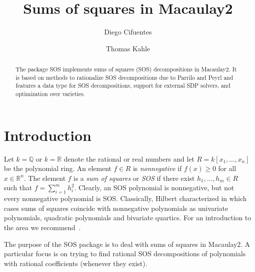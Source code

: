 \documentclass[11pt]{amsart}
\theoremstyle{plain}%
\theoremstyle{definition}
\theoremstyle{remark}
\newcommand{\SOS}{\textsc{SOS}\xspace}
\newcommand{\QQ}{\mathbb{Q}}
\newcommand{\RR}{\mathbb{R}}
\begin{document}
\title[SOS.m2]{Sums of squares in Macaulay2}

\author{Diego Cifuentes}
\address{Massachusetts Institute of Technology \\ Boston, USA}

\author{Thomas Kahle}
\address{Otto-von-Guericke University \\ Magdeburg, Germany}

\begin{abstract}
  The package \SOS implements sums of squares (SOS) decompositions in
  Macaulay2.  It is based on methods to rationalize SOS decompositions
  due to Parrilo and Peyrl and features a data type for SOS
  decompositions, support for external SDP solvers, and optimization
  over varieties.
\end{abstract}

\maketitle


\section{Introduction}

Let $k = \QQ$ or $k = \RR$ denote the rational or real numbers and let $R = k[x_{1},\dots,x_{n}]$ be the polynomial ring.  
An element $f\in R$ is \emph{nonnegative} if $f(x) \ge 0$ for all $x \in \RR^{n}$.  
The element $f$ is a \emph{sum of squares} or \emph{SOS} if there exist $h_{1},\dots,h_{m} \in R$ such that $f=\sum_{i=1}^{m}h_{i}^{2}$.
Clearly, an SOS polynomial is nonnegative, but not every nonnegative polynomial is SOS.
Classically, Hilbert characterized in which cases sums of squares coincide with nonnegative polynomials as univariate polynomials, quadratic polynomials and bivariate quartics.  
For an introduction to the area we recommend~\cite{scheiderer2009positivity,blekherman2012semidefinite}.

The purpose of the \SOS package is to deal with sums of squares in Macaulay2.
A particular focus is on trying to find rational SOS decompositions of polynomials with rational coefficients (whenever they exist).
\end{document}
